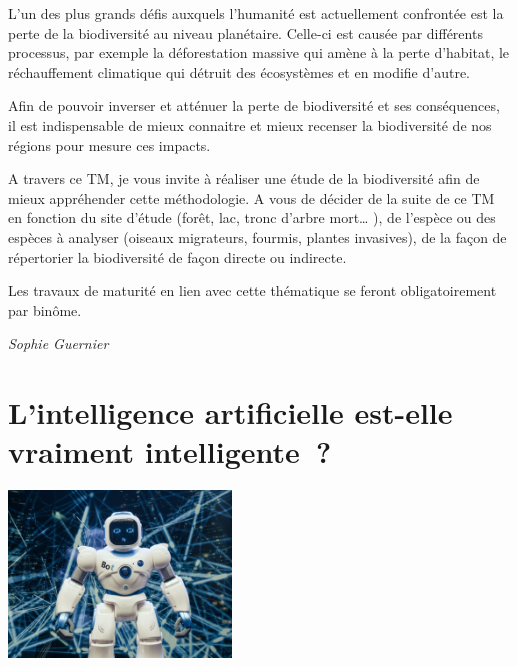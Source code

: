 \documentclass[
  10pt,
  french,
  a5paper,
  openany]{book}
\newenvironment{signature}{\begin{flushright}}{\end{flushright}}
\begin{document}
L'un des plus grands défis auxquels l'humanité est actuellement confrontée est la perte de la biodiversité au niveau planétaire. Celle-ci est causée par différents processus, par exemple la déforestation massive qui amène à la perte d'habitat, le réchauffement climatique qui détruit des écosystèmes et en modifie d'autre.

Afin de pouvoir inverser et atténuer la perte de biodiversité et ses conséquences, il est indispensable de mieux connaitre et mieux recenser la biodiversité de nos régions pour mesure ces impacts.

A travers ce TM, je vous invite à réaliser une étude de la biodiversité afin de mieux appréhender cette méthodologie. A vous de décider de la suite de ce TM en fonction du site d'étude (forêt, lac, tronc d'arbre mort\ldots{} ), de l'espèce ou des espèces à analyser (oiseaux migrateurs, fourmis, plantes invasives), de la façon de répertorier la biodiversité de façon directe ou indirecte.

Les travaux de maturité en lien avec cette thématique se feront obligatoirement par binôme.

\begin{signature}
\emph{Sophie Guernier}

\end{signature}

\hypertarget{lintelligence-artificielle-est-elle-vraiment-intelligente}{%
\chapter{\texorpdfstring{L'intelligence artificielle \linebreak est-elle vraiment intelligente~?}{L'intelligence artificielle est-elle vraiment intelligente~?}}\label{lintelligence-artificielle-est-elle-vraiment-intelligente}}

\begin{center}
\includegraphics[width=\textwidth,height=12em]{images/intelligence-artificelle.jpeg}

\end{center}
\end{document}
